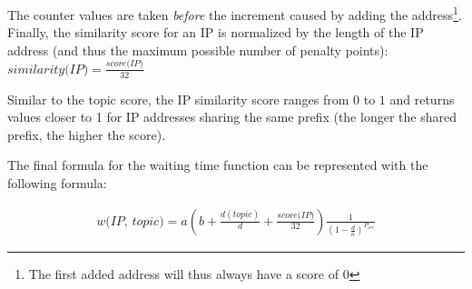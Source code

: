 The counter values are taken \emph{before} the increment caused by adding the address\footnote{The first added address will thus always have a score of $0$}. 
Finally, the similarity score for an IP is normalized by the length of the IP address (and thus the maximum possible number of penalty points): $\textit{similarity(IP}) = \frac{\textit{score(IP)}}{32}$

Similar to the topic score, the IP similarity score ranges from $0$ to $1$ and returns values closer to 1 for IP addresses sharing the same prefix (the longer the shared prefix, the higher the score).

The final formula for the waiting time function can be represented with the following formula:%

\begin{equation}
\begin{split}
    \textit{w(IP, topic)} = 
    a(b + \frac{d(topic)}{d} + \frac{\textit{score(IP)}}{32}
    )
    \frac{1}{(1-\frac{d}{n})^{P_\textit{occ}}}
\end{split}
\end{equation}



